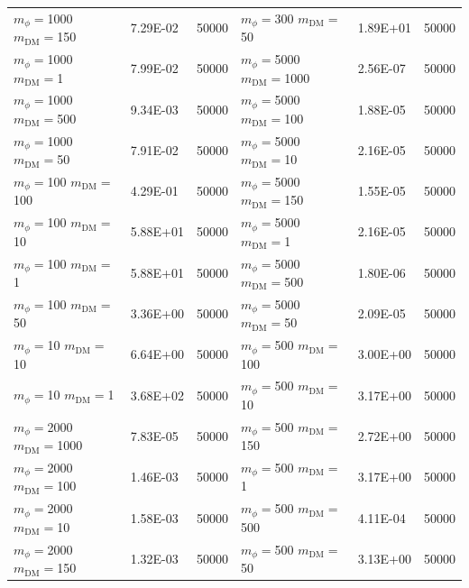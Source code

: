 \begin{table}[]
\begin{tabular}{lll||lll}
$m_\phi=$1000 $m_\textrm{DM}=$150   & 7.29E-02     & 50000                  &  $m_\phi=$300 $m_\textrm{DM}=$50     & 1.89E+01     & 50000                  \\ 
$m_\phi=$1000 $m_\textrm{DM}=$1     & 7.99E-02     & 50000                  &  $m_\phi=$5000 $m_\textrm{DM}=$1000  & 2.56E-07     & 50000                  \\ 
$m_\phi=$1000 $m_\textrm{DM}=$500   & 9.34E-03     & 50000                  &  $m_\phi=$5000 $m_\textrm{DM}=$100   & 1.88E-05     & 50000                  \\ 
$m_\phi=$1000 $m_\textrm{DM}=$50    & 7.91E-02     & 50000                  &  $m_\phi=$5000 $m_\textrm{DM}=$10    & 2.16E-05     & 50000                  \\ 
$m_\phi=$100 $m_\textrm{DM}=$100    & 4.29E-01     & 50000                  &  $m_\phi=$5000 $m_\textrm{DM}=$150   & 1.55E-05     & 50000                  \\ 
$m_\phi=$100 $m_\textrm{DM}=$10     & 5.88E+01     & 50000                  &  $m_\phi=$5000 $m_\textrm{DM}=$1     & 2.16E-05     & 50000                  \\ 
$m_\phi=$100 $m_\textrm{DM}=$1      & 5.88E+01     & 50000                  &  $m_\phi=$5000 $m_\textrm{DM}=$500   & 1.80E-06     & 50000                  \\ 
$m_\phi=$100 $m_\textrm{DM}=$50     & 3.36E+00     & 50000                  &  $m_\phi=$5000 $m_\textrm{DM}=$50    & 2.09E-05     & 50000                  \\ 
$m_\phi=$10 $m_\textrm{DM}=$10      & 6.64E+00     & 50000                  &  $m_\phi=$500 $m_\textrm{DM}=$100    & 3.00E+00     & 50000                  \\ 
$m_\phi=$10 $m_\textrm{DM}=$1       & 3.68E+02     & 50000                  &  $m_\phi=$500 $m_\textrm{DM}=$10     & 3.17E+00     & 50000                  \\ 
$m_\phi=$2000 $m_\textrm{DM}=$1000  & 7.83E-05     & 50000                  &  $m_\phi=$500 $m_\textrm{DM}=$150    & 2.72E+00     & 50000                  \\ 
$m_\phi=$2000 $m_\textrm{DM}=$100   & 1.46E-03     & 50000                  &  $m_\phi=$500 $m_\textrm{DM}=$1      & 3.17E+00     & 50000                  \\ 
$m_\phi=$2000 $m_\textrm{DM}=$10    & 1.58E-03     & 50000                  &  $m_\phi=$500 $m_\textrm{DM}=$500    & 4.11E-04     & 50000                  \\ 
$m_\phi=$2000 $m_\textrm{DM}=$150   & 1.32E-03     & 50000                  &  $m_\phi=$500 $m_\textrm{DM}=$50     & 3.13E+00     & 50000                  \\ 

\end{tabular}
\end{table}
